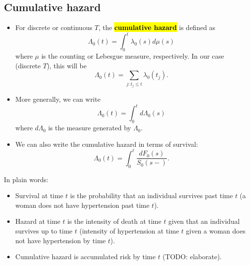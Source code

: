 \documentclass[12pt]{article}
\DeclareMathOperator{\1}{\mathds{1}}
\begin{document}
\hfill

\subsection{Cumulative hazard}
\begin{itemize}
	\item For discrete or continuous $T$, the \hl{\textbf{cumulative hazard}} is defined as 
	\[
	\Lambda_0(t) = \int_0^t \lambda_0(s)d\mu(s)
	\]
	where $\mu$ is the counting or Lebesgue measure, respectively. In our case (discrete $T$), this will be 
	\[
	\Lambda_0(t) = \sum_{j: t_j \le t}\lambda_0(t_j).
	\]
	\item More generally, we can write 
	\[
	\Lambda_0(t) = \int_0^t d\Lambda_0(s)
	\]
	where $d\Lambda_0$ is the measure generated by $\Lambda_0$. 
	\item We can also write the cumulative hazard in terms of survival:
	\[
	\Lambda_0(t) = \int_0^t \frac{dF_0(s)}{S_0(s-)}.
	\]
\end{itemize}

In plain words:
\begin{itemize}
	\item Survival at time $t$ is the probability that an individual survives past time $t$ (a woman does not have hypertension past time $t$). 
	\item Hazard at time $t$ is the intensity of death at time $t$ given that an individual survives up to time $t$ (intensity of hypertension at time $t$ given a woman does not have hypertension by time $t$). 
	\item Cumulative hazard is accumulated risk by time $t$ (TODO: elaborate).
\end{itemize}
\end{document}
